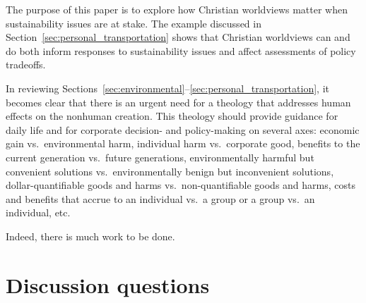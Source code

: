 \documentclass[12pt]{article}
\begin{document}
The purpose of this paper is to explore how
Christian worldviews matter 
when sustainability issues are at stake. 
The example discussed in Section~\ref{sec:personal_transportation} shows that
Christian worldviews can and do 
both inform responses to sustainability issues
and affect assessments of policy tradeoffs.

In reviewing Sections~\ref{sec:environmental}--\ref{sec:personal_transportation},
it becomes clear that there is an urgent need for a theology 
that addresses human effects on the nonhuman creation.
This theology should provide guidance for daily life and 
for corporate decision- and policy-making on several axes:
economic gain vs.\ environmental harm, 
individual harm vs.\ corporate good, 
benefits to the current generation vs.\ future generations,
environmentally harmful but convenient solutions vs.\ environmentally benign but inconvenient solutions, 
dollar-quantifiable goods and harms vs.\ non-quantifiable goods and harms,
costs and benefits that accrue to an individual vs.\ a group
or a group vs.\ an individual, etc.

Indeed, there is much work to be done.


\appendix

\section{Discussion questions}
\label{sec:discussion_questions}
\end{document}
